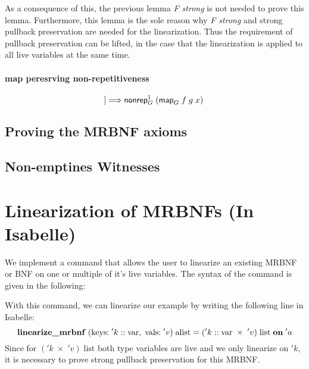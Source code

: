       As a consequence of this, the previous lemma \textit{F strong} is not needed to prove this lemma. Furthermore, this lemma is the sole reason why \textit{F strong} and strong pullback preservation are needed for the linearization. Thus the requirement of pullback preservation can be lifted, in the case that the linearization is applied to all live variables at the same time.

    \paragraph{map peresrving non-repetitiveness}
      \begin{equation*}
        [\![\text{\textsf{nonrep}}_G^1\; x;\; \text{\textsf{bijective}} f]\!] \Longrightarrow \text{\textsf{nonrep}}_G^1\; (\text{\textsf{map}}_G\; f\; g\; x)
      \end{equation*} 
      
  \subsection{Proving the MRBNF axioms}

  \subsection{Non-emptines Witnesses}
  \label{subsec:wits}

  \section{Linearization of MRBNFs (In Isabelle)}
    We implement a command that allows the user to linearize an existing \ac{MRBNF} or \ac{BNF} on one or multiple of it's live variables. The syntax of the command is given in the following:

    

    With this command, we can linearize our example by writing the following line in Isabelle:
    \begin{equation*}
      \text{\textbf{linearize\_mrbnf}}\; (\text{keys:}\; 'k :: \text{var},\; \text{vals:}\; 'v)\; \text{alist} = ('k :: \text{var}\; \times\; 'v)\; \text{list}\; \text{\textbf{on}}\; 'a
    \end{equation*}
    Since for $('k\; \times\; 'v)\; \text{list}$ both type variables are live and we only linearize on $'k$, it is necessary to prove strong pullback preservation for this \ac{MRBNF}. 

